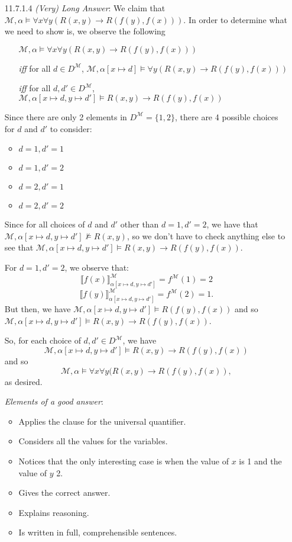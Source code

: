 \begin{itemize}
  \item[11.7.1.4] \emph{(Very) Long Answer}: We claim that
    $\mathcal{M},\alpha\vDash \forall x\forall y(R(x,y)\to R(f(y), f(x)))$.
    In order to determine what we need to show is, we observe the following
    \begin{itemize}
      \item[] $\mathcal{M},\alpha\vDash \forall
        x\forall y(R(x,y)\to R(f(y), f(x)))$
      \item[\emph{iff}] for all $d\in D^\mathcal{M}$,
        $\mathcal{M},\alpha[x\mapsto d]\vDash \forall y(R(x,y)\to
        R(f(y), f(x)))$
      \item[\emph{iff}] for all $d,d'\in D^\mathcal{M}$,
        $\mathcal{M},\alpha[x\mapsto d, y\mapsto d']\vDash R(x,y)\to
        R(f(y), f(x))$
    \end{itemize}
    Since there are only 2 elements in $D^\mathcal{M}=\{1,2\}$,
    there are 4 possible choices for $d$ and $d'$ to consider:
    \begin{itemize}
      \item $d=1, d'=1$
      \item $d=1, d'=2$
      \item $d=2, d'=1$
      \item $d=2, d'=2$
    \end{itemize}
    Since for all choices of $d$ and $d'$ other than $d=1, d'=2$, we
    have that $\mathcal{M},\alpha[x\mapsto d, y\mapsto d']\nvDash
    R(x,y)$, so we don't have to check anything else to see that $\mathcal{M},\alpha[x\mapsto d, y\mapsto d']\vDash R(x,y)\to
    R(f(y), f(x))$.

    For $d=1, d'=2$, we observe that:\[\llbracket
    f(x)\rrbracket^\mathcal{M}_{\alpha[x\mapsto d, y\mapsto
    d']}=f^\mathcal{M}(1)=2\]\[\llbracket
    f(y)\rrbracket^\mathcal{M}_{\alpha[x\mapsto d, y\mapsto
    d']}=f^\mathcal{M}(2)=1.\]
    But then, we have
    $\mathcal{M}, \alpha[x\mapsto d, y\mapsto d']\vDash R(f(y), f(x))$
    and so
    $\mathcal{M},\alpha[x\mapsto d, y\mapsto d']\vDash R(x,y)\to R(f(y), f(x))$.

      So, for each choice of $d,d'\in D^\mathcal{M}$, we have \[\mathcal{M},\alpha[x\mapsto d, y\mapsto d']\vDash R(x,y)\to
      R(f(y), f(x))\] and so \[\mathcal{M},\alpha\vDash \forall
      x\forall y(R(x,y)\to R(f(y), f(x)),\] as desired.

    \emph{Elements of a good answer}:

    \begin{itemize}
    \item Applies the clause for the universal quantifier.
    \item Considers all the values for the variables.
    \item Notices that the only interesting case is when the value of
      $x$ is 1 and the value of $y$ 2.
    \item Gives the correct answer.
    \item Explains reasoning.
    \item Is written in full, comprehensible sentences.
    \end{itemize}


\end{itemize}
